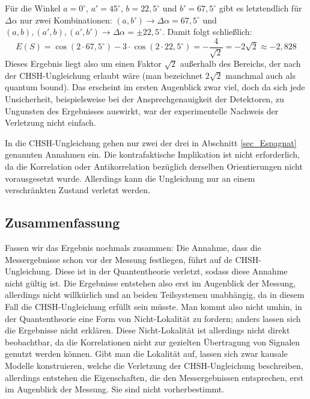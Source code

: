 F\"ur die Winkel $a=0^\circ$, $a'=45^\circ$, $b=22,5^\circ$ und 
$b'=67,5^\circ$ gibt es letztendlich f\"ur $\Delta \alpha$ nur
zwei Kombinationen: $(a,b') \rightarrow \Delta \alpha = 67,5^\circ$
und $(a,b), (a',b), (a',b') \rightarrow \Delta \alpha = \pm 22,5^\circ$.
Damit folgt schlie\ss lich:
\begin{equation}    
    E(S) = \cos (2\cdot 67,5^\circ) - 3 \cdot \cos ( 2\cdot 22,5^\circ) =
      - \frac{4}{\sqrt{2}} = - 2 \sqrt{2} \approx - 2,828   
\end{equation}  
Dieses 
Ergebnis liegt also um einen Faktor $\sqrt{2}$ au\ss erhalb
des Bereichs, der nach der CHSH-Ungleichung erlaubt w\"are
(man bezeichnet $2\sqrt{2}$ manchmal auch als \glqq quantum bound\grqq).
Das erscheint im ersten Augenblick zwar viel, doch da sich
jede Unsicherheit, beispielsweise bei der Ansprechgenauigkeit
der Detektoren, zu Ungunsten des Ergebnisses auswirkt,
war der experimentelle Nachweis der Verletzung nicht einfach.

In die CHSH-Ungleichung gehen nur zwei der drei in Abschnitt
\ref{sec_Espagnat} genannten Annahmen ein. Die kontrafaktische Implikation
ist 
nicht erforderlich, da die Korrelation oder Antikorrelation
bez\"uglich derselben Orientierungen nicht vorausgesetzt
wurde. Allerdings kann die Ungleichung nur an einem
verschr\"ankten Zustand verletzt werden.

\subsection{Zusammenfassung}

Fassen wir das Ergebnis nochmals zusammen: Die Annahme, dass die
Messergebnisse schon vor der Messung festliegen, f\"uhrt auf de CHSH-Ungleichung.
Diese ist in der Quantentheorie verletzt, sodass diese Annahme nicht g\"ultig
ist. Die Ergebnisse entstehen also erst im Augenblick der Messung, allerdings
nicht willk\"urlich und an beiden Teilsystemen unabh\"angig, da in diesem Fall
die CHSH-Ungleichung erf\"ullt sein m\"usste. Man kommt also nicht umhin,
in der Quantentheorie eine Form von Nicht-Lokalit\"at zu fordern; anders lassen sich
die Ergebnisse nicht erkl\"aren. Diese Nicht-Lokalit\"at ist allerdings nicht
direkt beobachtbar, da die Korrelationen nicht zur gezielten \"Ubertragung von
Signalen genutzt werden k\"onnen. Gibt man die Lokalit\"at auf, lassen sich
zwar kausale Modelle konstruieren, welche die Verletzung der CHSH-Ungleichung
beschreiben, allerdings entstehen die Eigenschaften, die den Messergebnissen  
entsprechen, erst im Augenblick der Messung. Sie sind nicht vorherbestimmt.

